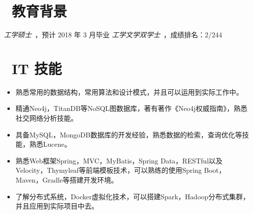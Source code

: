 \documentclass{resume}
\begin{document}



 
\section{\faGraduationCap\  教育背景}
\textit{工学硕士}\ ，预计 2018 年 3 月毕业
\textit{工学文学双学士}\ ，成绩排名：2/244

\section{\faCogs\ IT 技能}
\begin{itemize}[parsep=0.5ex]
  \item 熟悉常用的数据结构，常用算法和设计模式，并且可以运用到实际工作中。
  \item 精通Neo4j，TitanDB等NoSQL图数据库，著有著作《Neo4j权威指南》，熟悉社交网络分析技能。
  \item 具备MySQL，MongoDB数据库的开发经验，熟悉数据的检索，查询优化等技能，熟悉Lucene。
  \item 熟悉Web框架Spring，MVC，MyBatis，Spring Data，RESTful以及Velocity，Thymyleaf等前端模板技术，可以熟练的使用Spring Boot，Maven，Gradle等搭建开发环境。
  \item 了解分布式系统，Docker虚拟化技术，可以搭建Spark，Hadoop分布式集群，并且应用到实际项目中去。
\end{itemize}
\end{document}
